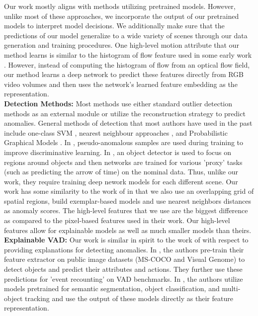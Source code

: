 Our work mostly aligns with methods utilizing pretrained models. However, unlike most of these approaches, we incorporate the output of our pretrained models to interpret model decisions. We additionally make sure that the predictions of our model generalize to a wide variety of scenes through our data generation and training procedures.  One high-level motion attribute that our method learns is similar to the histogram of flow feature used in some early work \cite{saligrama2010video,saligrama2012video,cong2013abnormal}.  However, instead of computing the histogram of flow from an optical flow field, our method learns a deep network to predict these features directly from RGB video volumes and then uses the network's learned feature embedding as the representation.
\\
\textbf{Detection Methods:} Most methods use either standard outlier detection methods \cite{chandola2009anomaly} as an external module or utilize the reconstruction strategy to predict anomalies. General methods of detection that most authors have used in the past include one-class SVM \cite{smeureanu2017deep, ionescu2019detecting, ma2015anomaly, xu2015learning}, nearest neighbour approaches \cite{ramachandra2020street, ramachandra2020learning, hinami2017joint, doshi2020any, doshi2021efficient}, and Probabilistic Graphical Models \cite{antic2011video}. In \cite{astrid2021synthetic, georgescu2021background}, pseudo-anomalous samples are used during training to improve discriminative learning.  In \cite{georgescu2021anomaly}, an object detector is used to focus on regions around objects and then networks are trained for various 'proxy' tasks (such as predicting the arrow of time) on the nominal data.  Thus, unlike our work, they require training deep nework models for each different scene.
Our work has some similarity to the work of \cite{ramachandra2020street,ramachandra2020learning} in that we also use an overlapping grid of spatial regions, build exemplar-based models and use nearest neighbors distances as anomaly scores.  The high-level features that we use are the biggest difference as compared to the pixel-based features used in their work.  Our high-level features allow for explainable models as well as much smaller models than theirs.
\\
\textbf{Explainable VAD:} 
Our work is similar in spirit to the work of \cite{hinami2017joint, wu2021explainable} with respect to providing explanations for detecting anomalies. In \cite{hinami2017joint}, the authors pre-train their feature extractor on public image datasets (MS-COCO and Visual Genome) to detect objects and predict their attributes and actions. They further use these predictions for 'event recounting' on VAD benchmarks. In \cite{wu2021explainable}, the authors utilize models pretrained for semantic segmentation, object classification, and multi-object tracking
and use the output of these models directly as their feature representation.

